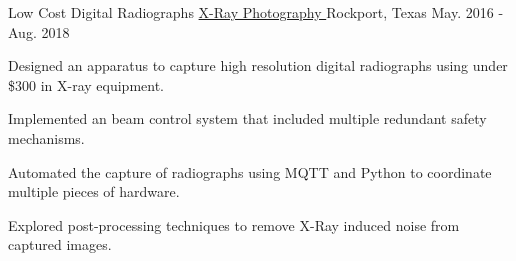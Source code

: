 \begin{cventries}
  \cventry
    {Low Cost Digital Radiographs} %
		{
			\href{https://github.com/TidalPaladin/xray-controller.git}
			{X-Ray Photography \faGithubSquare}
		} %
    {Rockport, Texas} %
    {May. 2016 - Aug. 2018} %
	{
	\begin{cvitems}
		\item {
			Designed an apparatus to capture high resolution
			digital radiographs using under \$300 in X-ray equipment.
		}
		\item {
			Implemented an beam control system that included multiple
			redundant safety mechanisms.
		}
		\item {
			Automated the capture of radiographs using MQTT and Python
			to coordinate multiple pieces of hardware.
		}
		\item {
			Explored post-processing techniques to remove X-Ray induced
			noise from captured images.
		}
	\end{cvitems}
	}
\end{cventries}

